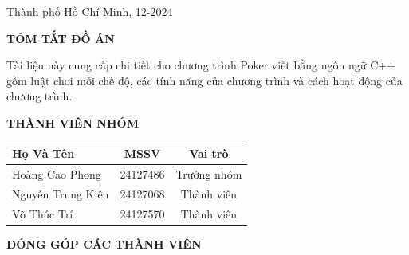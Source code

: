 \documentclass{article}
\begin{document}
\begin{center}
\vspace{2cm}
\fontsize{14pt}{0pt} \selectfont Thành phố Hồ Chí Minh, 12-2024

\end{center}

\newpage
\tableofcontents


\newpage
\begin{center}
{\textbf{\fontsize{16pt}{0pt} \selectfont TÓM TẮT ĐỒ ÁN}}
\end{center}

\hspace{1cm}
Tài liệu này cung cấp chi tiết cho chương trình Poker viết bằng ngôn ngữ C++ gồm luật chơi mỗi chế độ, các tính năng của chương trình và cách hoạt động của chương trình.

\newpage
\begin{center}
\textbf{\fontsize{16pt}{0pt} \selectfont THÀNH VIÊN NHÓM}


\begin{table}[!ht]
    \centering
    \begin{tabular}{|l|c|c|}
    \hline
        Họ Và Tên & MSSV & Vai trò  \\ \hline
        Hoàng Cao Phong & 24127486 & Trưởng nhóm \\ \hline
        Nguyễn Trung Kiên & 24127068 & Thành viên  \\ \hline
        Võ Thúc Trí & 24127570 & Thành viên \\ \hline
    \end{tabular}
\end{table}

\end{center}

\newpage
\begin{center}
\textbf{\fontsize{16pt}{0pt} \selectfont ĐÓNG GÓP CÁC THÀNH VIÊN}
\end{center}
\end{document}
